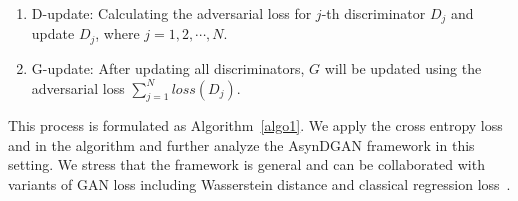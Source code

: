 
\begin{enumerate}[1)]
	\item D-update: Calculating the adversarial loss for $j$-th discriminator $D_j$ and update $D_j$, where $j=1, 2, \cdots, N$.
	\item G-update: After updating all discriminators, $G$ will be updated using the adversarial loss $\sum_{j=1}^N loss(D_j)$.
\end{enumerate}

This process is formulated as Algorithm~\ref{algo1}. We apply the cross entropy loss and in the algorithm and further analyze the AsynDGAN framework in this setting. We stress that the framework is general and can be collaborated with variants of GAN loss including Wasserstein distance and classical regression loss~\cite{arjovsky2017wasserstein,mao2017least}.


